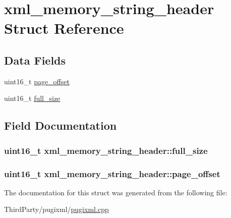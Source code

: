 \hypertarget{structxml__memory__string__header}{\section{xml\-\_\-memory\-\_\-string\-\_\-header Struct Reference}
\label{structxml__memory__string__header}
}
\subsection*{Data Fields}
\begin{DoxyCompactItemize}
\item 
uint16\-\_\-t \hyperlink{structxml__memory__string__header_a0cc274672f1263f73eeb6bf839bf96ee}{page\-\_\-offset}
\item 
uint16\-\_\-t \hyperlink{structxml__memory__string__header_abbb48a709081e6610dffad322499e3f7}{full\-\_\-size}
\end{DoxyCompactItemize}


\subsection{Field Documentation}
\hypertarget{structxml__memory__string__header_abbb48a709081e6610dffad322499e3f7}{
\subsubsection[{full\-\_\-size}]{\setlength{\rightskip}{0pt plus 5cm}uint16\-\_\-t xml\-\_\-memory\-\_\-string\-\_\-header\-::full\-\_\-size}}\label{structxml__memory__string__header_abbb48a709081e6610dffad322499e3f7}
\hypertarget{structxml__memory__string__header_a0cc274672f1263f73eeb6bf839bf96ee}{
\subsubsection[{page\-\_\-offset}]{\setlength{\rightskip}{0pt plus 5cm}uint16\-\_\-t xml\-\_\-memory\-\_\-string\-\_\-header\-::page\-\_\-offset}}\label{structxml__memory__string__header_a0cc274672f1263f73eeb6bf839bf96ee}


The documentation for this struct was generated from the following file\-:\begin{DoxyCompactItemize}
\item 
Third\-Party/pugixml/\hyperlink{pugixml_8cpp}{pugixml.\-cpp}\end{DoxyCompactItemize}
